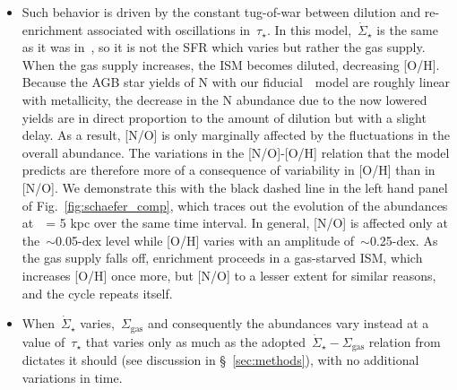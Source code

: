 \documentclass[ms.tex]{subfiles}
\begin{document}
\begin{itemize}
	\item Such behavior is driven by the constant tug-of-war between dilution 
	and re-enrichment associated with oscillations in~$\tau_\star$. 
	In this model,~$\dot{\Sigma}_\star$ is the same as it was 
	in~\citet{Johnson2021}, so it is not the SFR which varies but rather the 
	gas supply. 
	When the gas supply increases, the ISM becomes diluted, decreasing [O/H]. 
	Because the AGB star yields of N with our fiducial~\cristallo~model are 
	roughly linear with metallicity, the decrease in the N abundance due to the 
	now lowered yields are in direct proportion to the amount of dilution but 
	with a slight delay. 
	As a result, [N/O] is only marginally affected by the fluctuations in the 
	overall abundance. 
	The variations in the [N/O]-[O/H] relation that the model predicts are 
	therefore more of a consequence of variability in [O/H] than in [N/O]. 
	We demonstrate this with the black dashed line in the left hand panel of 
	Fig.~\ref{fig:schaefer_comp}, which traces out the evolution of the 
	abundances at~\rgal~= 5 kpc over the same time interval. 
	In general, [N/O] is affected only at the~$\sim$0.05-dex level while 
	[O/H] varies with an amplitude of~$\sim$0.25-dex. 
	As the gas supply falls off, enrichment proceeds in a gas-starved ISM, 
	which increases [O/H] once more, but [N/O] to a lesser extent for similar 
	reasons, and the cycle repeats itself. 

	\item When~$\dot{\Sigma}_\star$ varies,~$\Sigma_\text{gas}$ and 
	consequently the abundances vary instead at a value of~$\tau_\star$ that 
	varies only as much as the adopted~$\dot{\Sigma}_\star - \Sigma_\text{gas}$ 
	relation from~\citet{Johnson2021} dictates it should (see discussion in 
	\S~\ref{sec:methods}), with no additional variations in time. 


\end{itemize}
\end{document}
